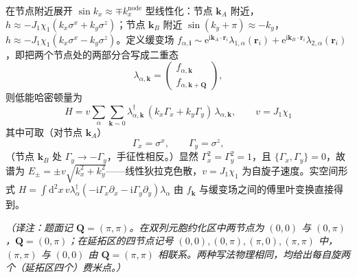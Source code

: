 在节点附近展开 $\sin k_x\approx\mp k_x^{\text{node}}$ 型线性化：节点 $\pmb{k}_A$ 附近，$h\approx-J_1\chi_1(k_x\sigma^x+k_y\sigma^z)$；节点 $\pmb{k}_B$ 附近 $\sin(k_y+\pi)\approx-k_y$，$h\approx-J_1\chi_1(k_x\sigma^x-k_y\sigma^z)$。定义缓变场 $f_{\alpha,\pmb{i}}\sim\mathrm{e}^{\mathrm{i}\pmb{k}_A\cdot\pmb{r}_i}\lambda_{1,\alpha}(\pmb{r}_i)+\mathrm{e}^{\mathrm{i}\pmb{k}_B\cdot\pmb{r}_i}\lambda_{2,\alpha}(\pmb{r}_i)$，即把两个节点处的两部分合写成二重态
\begin{equation*}
\lambda_{\alpha,\pmb{k}}=\begin{pmatrix}f_{\alpha,\pmb{k}}\\ f_{\alpha,\pmb{k}+\pmb{Q}}\end{pmatrix},
\end{equation*}
则低能哈密顿量为
\begin{equation*}
\boxed{\;H=v\sum_{\alpha}\sum_{\pmb{k}\sim0}\lambda^{\dagger}_{\alpha,\pmb{k}}\,(k_x\Gamma_x+k_y\Gamma_y)\,\lambda_{\alpha,\pmb{k}},\qquad
v=J_1\chi_1\;}
\end{equation*}
其中可取（对节点 $\pmb{k}_A$）
\begin{equation*}
\Gamma_x=\sigma^x,\qquad \Gamma_y=\sigma^z ,
\end{equation*}
（节点 $\pmb{k}_B$ 处 $\Gamma_y\to-\Gamma_y$，手征性相反。）显然 $\Gamma_x^2=\Gamma_y^2=1$，且 $\{\Gamma_x,\Gamma_y\}=0$，故谱为 $E_{\pm}=\pm v\sqrt{k_x^2+k_y^2}$——线性狄拉克色散，$v=J_1\chi_1$ 为自旋子速度。实空间形式 $H=\int\mathrm{d}^2x\,v\lambda^{\dagger}_{\alpha}(-\mathrm{i}\Gamma_x\partial_x-\mathrm{i}\Gamma_y\partial_y)\lambda_{\alpha}$ 由 $f_{\pmb{k}}$ 与缓变场之间的傅里叶变换直接得到。

\emph{（译注：题面记 $\pmb{Q}=(\pi,\pi)$。在双列元胞约化区中两节点为 $(0,0)$ 与 $(0,\pi)$，$\pmb{Q}=(0,\pi)$；在延拓区的四节点记号 $(0,0),(0,\pi),(\pi,0),(\pi,\pi)$ 中，$(\pi,\pi)$ 与 $(0,0)$ 由 $\pmb{Q}=(\pi,\pi)$ 相联系。两种写法物理相同，均给出每自旋两个（延拓区四个）费米点。）}

